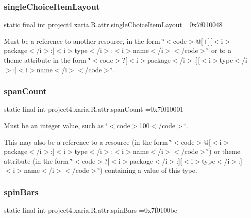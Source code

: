 \subsubsection{\texorpdfstring{single\+Choice\+Item\+Layout}{singleChoiceItemLayout}}
{\footnotesize\ttfamily static final int project4.\+xaria.\+R.\+attr.\+single\+Choice\+Item\+Layout =0x7f010048\hspace{0.3cm}{\ttfamily [static]}}

Must be a reference to another resource, in the form \char`\"{}$<$code$>$@\mbox{[}+\mbox{]}\mbox{[}$<$i$>$package$<$/i$>$\+:\mbox{]}$<$i$>$type$<$/i$>$\+:$<$i$>$name$<$/i$>$$<$/code$>$\char`\"{} or to a theme attribute in the form \char`\"{}$<$code$>$?\mbox{[}$<$i$>$package$<$/i$>$\+:\mbox{]}\mbox{[}$<$i$>$type$<$/i$>$\+:\mbox{]}$<$i$>$name$<$/i$>$$<$/code$>$\char`\"{}. \mbox{\label{classproject4_1_1xaria_1_1R_1_1attr_aa031c4f7c55f05ec3ac977820b23242e}} 
\subsubsection{\texorpdfstring{span\+Count}{spanCount}}
{\footnotesize\ttfamily static final int project4.\+xaria.\+R.\+attr.\+span\+Count =0x7f010001\hspace{0.3cm}{\ttfamily [static]}}

Must be an integer value, such as \char`\"{}$<$code$>$100$<$/code$>$\char`\"{}. 

This may also be a reference to a resource (in the form \char`\"{}$<$code$>$@\mbox{[}$<$i$>$package$<$/i$>$\+:\mbox{]}$<$i$>$type$<$/i$>$\+:$<$i$>$name$<$/i$>$$<$/code$>$\char`\"{}) or theme attribute (in the form \char`\"{}$<$code$>$?\mbox{[}$<$i$>$package$<$/i$>$\+:\mbox{]}\mbox{[}$<$i$>$type$<$/i$>$\+:\mbox{]}$<$i$>$name$<$/i$>$$<$/code$>$\char`\"{}) containing a value of this type. \mbox{\label{classproject4_1_1xaria_1_1R_1_1attr_af1d3ef014b1fb93c27e176c328f92ae3}} 
\subsubsection{\texorpdfstring{spin\+Bars}{spinBars}}
{\footnotesize\ttfamily static final int project4.\+xaria.\+R.\+attr.\+spin\+Bars =0x7f0100be\hspace{0.3cm}{\ttfamily [static]}}

